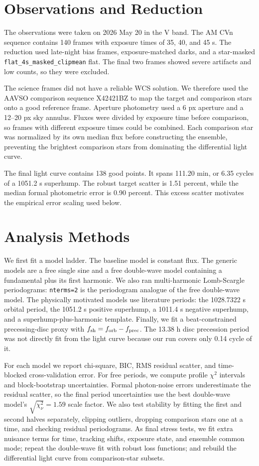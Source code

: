 \documentclass[11pt]{article}
\begin{document}
\section{Observations and Reduction}

The observations were taken on 2026 May 20 in the V band.  The AM CVn sequence
contains 140 frames with exposure times of 35, 40, and 45 s.  The reduction used
late-night bias frames, exposure-matched darks, and a star-masked
\texttt{flat\_4s\_masked\_clipmean} flat.  The final two frames showed severe
artifacts and low counts, so they were excluded.

The science frames did not have a reliable WCS solution.  We therefore used the
AAVSO comparison sequence X42421BZ to map the target and comparison stars onto
a good reference frame.  Aperture photometry used a 6 px aperture and a
12--20 px sky annulus.  Fluxes were divided by exposure time before comparison,
so frames with different exposure times could be combined.  Each comparison
star was normalized by its own median flux before constructing the ensemble,
preventing the brightest comparison stars from dominating the differential
light curve.

The final light curve contains 138 good points.  It spans 111.20 min, or 6.35
cycles of a 1051.2 s superhump.  The robust target scatter is 1.51 percent,
while the median formal photometric error is 0.90 percent.  This excess scatter
motivates the empirical error scaling used below.

\section{Analysis Methods}

We first fit a model ladder.  The baseline model is constant flux.  The
generic models are a free single sine and a free double-wave model containing a
fundamental plus its first harmonic.  We also ran multi-harmonic
Lomb-Scargle periodograms: \texttt{nterms=2} is the periodogram analogue of the
free double-wave model.  The physically motivated models use literature
periods: the 1028.7322 s orbital period, the 1051.2 s positive superhump, a
1011.4 s negative superhump, and a superhump-plus-harmonic template.  Finally,
we fit a beat-constrained precessing-disc proxy with
\(f_{\rm sh}=f_{\rm orb}-f_{\rm prec}\).  The 13.38 h disc precession period
was not directly fit from the light curve because our run covers only 0.14
cycle of it.

For each model we report chi-square, BIC, RMS residual scatter, and
time-blocked cross-validation error.  For free periods, we compute profile
\(\chi^2\) intervals and block-bootstrap uncertainties.  Formal photon-noise
errors underestimate the residual scatter, so the final period uncertainties
use the best double-wave model's \(\sqrt{\chi^2_\nu}=1.59\) scale factor.  We
also test stability by fitting the first and second halves separately, clipping
outliers, dropping comparison stars one at a time, and checking residual
periodograms.  As final stress tests, we fit extra nuisance terms for time,
tracking shifts, exposure state, and ensemble common mode; repeat the
double-wave fit with robust loss functions; and rebuild the differential light
curve from comparison-star subsets.
\end{document}
